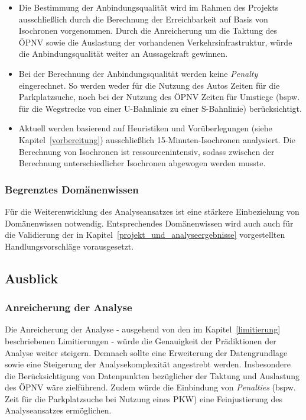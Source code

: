 \begin{itemize}
    \item Die Bestimmung der Anbindungsqualität wird im Rahmen des Projekts ausschließlich durch die Berechnung der Erreichbarkeit auf Basis von Isochronen vorgenommen. Durch die Anreicherung um die Taktung des ÖPNV sowie die Auslastung der vorhandenen Verkehrsinfrastruktur, würde die Anbindungsqualität weiter an Aussagekraft gewinnen.
    \item Bei der Berechnung der Anbindungsqualität werden keine \emph{Penalty} eingerechnet. So werden weder für die Nutzung des Autos Zeiten für die Parkplatzsuche, noch bei der Nutzung des ÖPNV Zeiten für Umstiege (bspw. für die Wegstrecke von einer U-Bahnlinie zu einer S-Bahnlinie) berücksichtigt.
    \item Aktuell werden basierend auf Heuristiken und Vorüberlegungen (siehe Kapitel~\ref{vorbereitung}) ausschließlich 15-Minuten-Isochronen analysiert​. Die Berechnung von Isochronen ist ressourcenintensiv, sodass zwischen der Berechnung unterschiedlicher Isochronen abgewogen werden musste.
\end{itemize}

\subsubsection{Begrenztes Domänenwissen}
 Für die Weiterenwicklung des Analyseansatzes ist eine stärkere Einbeziehung von Domänenwissen notwendig. Entsprechendes Domänenwissen wird auch auch für die Validierung der in Kapitel~\ref{projekt_und_analyseergebnisse} vorgestellten Handlungsvorschläge vorausgesetzt.

\subsection{Ausblick}

\subsubsection{Anreicherung der Analyse}
Die Anreicherung der Analyse - ausgehend von den im Kapitel~\ref{limitierung} beschriebenen Limitierungen - würde die Genauigkeit der Prädiktionen der Analyse weiter steigern. Demnach sollte eine Erweiterung der Datengrundlage sowie eine Steigerung der Analysekomplexität angestrebt werden. Insbesondere die Berücksichtigung von Datenpunkten bezüglicher der Taktung und Auslastung des ÖPNV wäre zielführend. Zudem würde die Einbindung von \emph{Penalties} (bspw. Zeit für die Parkplatzsuche bei Nutzung eines PKW) eine Feinjustierung des Analyseansatzes ermöglichen.

